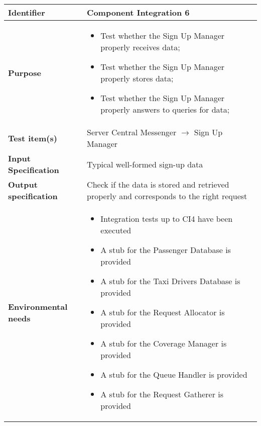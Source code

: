 \begin{center}
\begin{tabular}{lp{}}
\toprule
\textbf{Identifier}		&	Component Integration 6\\
\midrule
\textbf{Purpose}		&	\begin{itemize}
					\item Test whether the Sign Up Manager properly receives data;
					\item Test whether the Sign Up Manager properly stores data;
					\item Test whether the Sign Up Manager properly answers to queries for data;
					\end{itemize}	\\
\textbf{Test item(s)}	&	Server Central Messenger $\rightarrow$ Sign Up Manager\\
\textbf{Input Specification}	&	Typical well-formed sign-up data\\
\textbf{Output specification}	&	Check if the data is stored and retrieved properly and corresponds to the right request\\
\textbf{Environmental needs}	&	\begin{itemize}
							\item Integration tests up to CI4 have been executed
							\item A stub for the Passenger Database is provided
							\item A stub for the Taxi Drivers Database is provided											\item A stub for the Request Allocator is provided
							\item A stub for the Coverage Manager is provided
							\item A stub for the Queue Handler is provided
							\item A stub for the Request Gatherer is provided
							\end{itemize}	\\
\bottomrule
\end{tabular}
\end{center}



